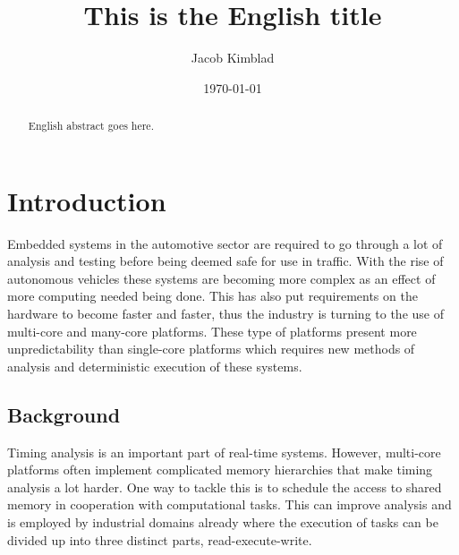 \documentclass{kththesis}
\title{This is the English title}
\author{Jacob Kimblad}
\date{\today}
\begin{document}
\frontmatter

\titlepage

\begin{abstract} 

    English abstract goes here.

\end{abstract}


\begin{otherlanguage}{swedish} 
    
    \begin{abstract}

    \end{abstract} 

\end{otherlanguage}


\printnomenclature


\tableofcontents


\mainmatter


\chapter{Introduction} 

Embedded systems in the automotive sector are required to go through a lot of analysis and testing
before being deemed safe for use in traffic. With the rise of autonomous vehicles these systems are
becoming more complex as an effect of more computing needed being done.  This has also put
requirements on the hardware to become faster and faster, thus the industry is turning to the use of
multi-core and many-core platforms. These type of platforms present more unpredictability than
single-core platforms which requires new methods of analysis and deterministic execution of these
systems. 


\section{Background} 

Timing analysis is an important part of real-time systems. However, multi-core platforms often
implement complicated memory hierarchies that make timing analysis a lot harder. One way to tackle
this is to schedule the access to shared memory in cooperation with computational tasks. This can
improve analysis and is employed by industrial domains already where the execution of tasks can be
divided up into three distinct parts, read-execute-write.
\end{document}
